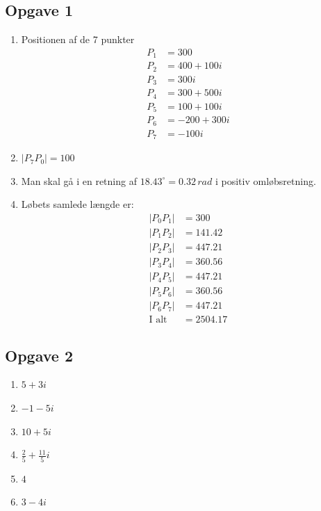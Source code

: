 \documentclass[a4paper, 12pt,titlepage]{article}
\begin{document}
\subsection*{Opgave 1}
\label{sec:orgb48bd86}
\begin{enumerate}
\item Positionen af de 7 punkter
\begin{align*}
P_1 &= 300 \\
P_2 &= 400 + 100i \\
P_3 &= 300i \\
P_4 &= 300 + 500i \\
P_5 &= 100 + 100i \\
P_6 &= -200 + 300i \\
P_7 &= -100i
\end{align*}
\item \(\left| P_7 P_0 \right| = 100\)
\item Man skal gå i en retning af \(18.43^{\circ}=0.32\,rad\) i positiv omløbsretning.
\item Løbets samlede længde er:
\begin{align*}
\left| P_0 P_1 \right| &= 300 \\
\left| P_1 P_2 \right| &= 141.42 \\
\left| P_2 P_3 \right| &= 447.21 \\
\left| P_3 P_4 \right| &= 360.56 \\
\left| P_4 P_5 \right| &= 447.21 \\
\left| P_5 P_6 \right| &= 360.56 \\ 
\left| P_6 P_7 \right| &= 447.21 \\
\text{I alt} &= 2504.17 
\end{align*}
\end{enumerate}

\subsection*{Opgave 2}
\label{sec:orgc69665f}
\begin{enumerate}
\item \(5+3i\)
\item \(-1-5i\)
\item \(10+5i\)
\item \(\frac{2}{5} +\frac{11}{5} i\)
\item \(4\)
\item \(3-4i\)
\end{enumerate}
\end{document}
